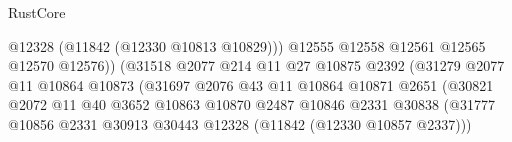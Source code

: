 \begin{lexlean}{RustCore}
\begin{coremodule}
                                                    @12328
                                                    (@11842 (@12330 @10813 @10829)))
                                                  @12555
                                                  @12558
                                                  @12561
                                                  @12565
                                                  @12570
                                                  @12576))
                                              (@31518
                                                @2077
                                                @214
                                                @11
                                                @27
                                                @10875
                                                @2392
                                                (@31279
                                                  @2077
                                                  @11
                                                  @10864
                                                  @10873
                                                  (@31697
                                                    @2076
                                                    @43
                                                    @11
                                                    @10864
                                                    @10871
                                                    @2651
                                                    (@30821
                                                      @2072
                                                      @11
                                                      @40
                                                      @3652
                                                      @10863
                                                      @10870
                                                      @2487
                                                      @10846
                                                      @2331
                                                      @30838
                                                      (@31777
                                                        @10856
                                                        @2331
                                                        @30913
                                                        @30443
                                                        @12328
                                                        (@11842 (@12330 @10857 @2337)))

\end{coremodule}
\end{lexlean}
